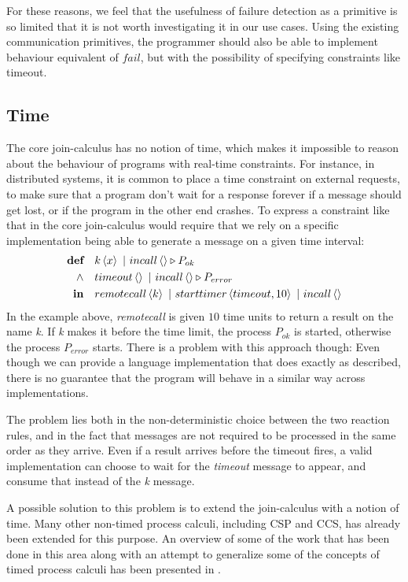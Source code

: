 For these reasons, we feel that the usefulness of failure detection as a
primitive is so limited that it is not worth investigating it in our use cases.
Using the existing communication primitives, the programmer should also be able
to implement behaviour equivalent of $fail$, but with the possibility of
specifying constraints like timeout.

\subsection{Time}

The core join-calculus has no notion of time, which makes it
impossible to reason about the behaviour of programs with real-time
constraints.  For instance, in distributed systems, it is common to
place a time constraint on external requests, to make sure that a
program don't wait for a response forever if a message should get
lost, or if the program in the other end crashes. To express a
constraint like that in the core join-calculus would require that we
rely on a specific implementation being able to generate a message on
a given time interval:
\begin{align*}
  \textbf{def}\quad & \atm k<x> ~|~ \atm incall<> \triangleright P_{ok} \\
  \land\quad & \atm timeout<> ~|~ \atm incall<> \triangleright P_{error} \\
  \textbf{in}\quad & \atm remotecall<k> ~|~ \atm starttimer<timeout, 10>
                                      ~|~ \atm incall<>
\end{align*}
In the example above, \emph{remotecall} is given $10$ time units to
return a result on the name \emph{k}. If \emph{k} makes it before the
time limit, the process $P_{ok}$ is started, otherwise the process
$P_{error}$ starts.  There is a problem with this approach though:
Even though we can provide a language implementation that does exactly as
described, there is no guarantee that the program will behave in a similar way
across implementations.

The problem lies both in the non-deterministic choice between the two
reaction rules, and in the fact that messages are not required to be
processed in the same order as they arrive. Even if a result arrives
before the timeout fires, a valid implementation can choose to wait
for the \emph{timeout} message to appear, and consume that instead of
the \emph{k} message.

A possible solution to this problem is to extend the join-calculus
with a notion of time. Many other non-timed process calculi, including
CSP and CCS, has already been extended for this purpose. An overview
of some of the work that has been done in this area along with an
attempt to generalize some of the concepts of timed process calculi
has been presented in \cite{nicollin-overview}.

